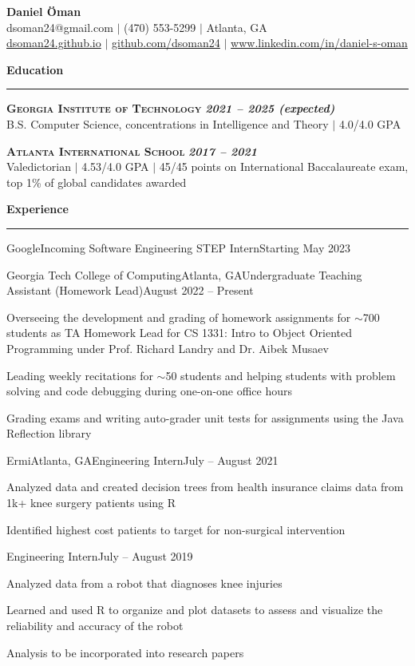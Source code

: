 \documentclass{article}
\newcommand{\horizontal}{\vspace{2pt}\hrule}
\newcommand{\school}[3]{\vspace{2pt}\textsc{\textbf{#1}} \hfill \textbf{\textit{#2}} \\ #3}
\newcommand{\sectitle}[1]{\vspace{2pt} \textbf{\large #1} \horizontal}
\begin{document}
\thispagestyle{empty}
\begin{center}
    \textbf{\LARGE Daniel Öman} \\
    dsoman24@gmail.com $|$ (470) 553-5299 $|$ Atlanta, GA \\
    \href{https://dsoman24.github.io/}{dsoman24.github.io} $|$ \href{https://github.com/dsoman24}{github.com/dsoman24} $|$ \href{https://www.linkedin.com/in/daniel-s-oman/}{www.linkedin.com/in/daniel-s-oman}
\end{center}

\begin{flushleft}
\sectitle{Education}

\school{Georgia Institute of Technology}{2021 -- 2025 (expected)}
{B.S. Computer Science, concentrations in Intelligence and Theory $|$ 4.0/4.0 GPA}

\school{Atlanta International School}{2017 -- 2021}
{Valedictorian $|$ 4.53/4.0 GPA $|$ 45/45 points on International Baccalaureate exam, top 1\% of global candidates awarded}

\sectitle{Experience}

    \begin{experience_no_list}{Google}{}{Incoming Software Engineering STEP Intern}{Starting May 2023}
    \end{experience_no_list}

    \begin{experience}{Georgia Tech College of Computing}{Atlanta, GA}{Undergraduate Teaching Assistant (Homework Lead)}{August 2022 -- Present}
        \item Overseeing the development and grading of homework assignments for $\sim$700 students as TA Homework Lead for CS 1331: Intro to Object Oriented Programming under Prof. Richard Landry and Dr. Aibek Musaev
        \item Leading weekly recitations for $\sim$50 students and helping students with problem solving and code debugging during one-on-one office hours
        \item Grading exams and writing auto-grader unit tests for assignments using the Java Reflection library
    \end{experience}

    \begin{experience}{Ermi}{Atlanta, GA}{Engineering Intern}{July -- August 2021}
        \item Analyzed data and created decision trees from health insurance claims data from 1k+ knee surgery patients using R
        \item Identified highest cost patients to target for non-surgical intervention
    \end{experience}
    \begin{subexperience}{Engineering Intern}{July -- August 2019}
        \item Analyzed data from a robot that diagnoses knee injuries
        \item Learned and used R to organize and plot datasets to assess and visualize the reliability and accuracy of the robot
        \item Analysis to be incorporated into research papers
    \end{subexperience}


\end{flushleft}
\end{document}
